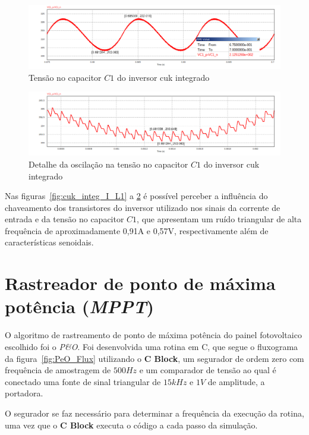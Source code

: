 \documentclass[
	12pt,				%
	openany,
	onseside,
	a4paper,			%
	english,			%
	french,				%
	spanish,			%
	brazil,				%
	]{abntex2}
\begin{document}
\begin{figure}[H]%
	\centering
		\includegraphics[width= \linewidth]{cuk_integ_VC1}
		\caption{Tensão no capacitor $C1$ do inversor cuk integrado}
		\label{fig:cuk_integ_V_C1}
\end{figure}

\begin{figure}[H]%
	\centering
		\includegraphics[width= \linewidth]{cuk_integ_ripp_VC1}
		\caption{Detalhe da oscilação na tensão no capacitor $C1$ do inversor cuk integrado}
		\label{fig:cuk_integ_ripp_V_C1}
\end{figure}

Nas figuras~\ref{fig:cuk_integ_I_L1} a \ref{fig:cuk_integ_ripp_V_C1} é possível perceber a influência do chaveamento dos transistores do inversor utilizado nos sinais da corrente de entrada e da tensão no capacitor $C1$, que apresentam um ruído triangular de alta frequência de aproximadamente 0,91A e 0,57V, respectivamente além de características senoidais.


\section{Rastreador de ponto de máxima potência (\textit{MPPT})}\label{sec:met_mppt}

O algoritmo de rastreamento de ponto de máxima potência do painel fotovoltaico escolhido foi o \textit{P\&O}. Foi desenvolvida uma rotina em C, que segue o fluxograma da figura~\ref{fig:PeO_Flux} utilizando o \textbf{C Block}, um segurador de ordem zero com frequência de amostragem de $500Hz$ e um comparador de tensão ao qual é conectado uma fonte de sinal triangular de $15kHz$ e $1V$ de amplitude, a portadora.

O segurador se faz necessário para determinar a frequência da execução da rotina, uma vez que o \textbf{C Block} executa o código a cada passo da simulação.
\end{document}
